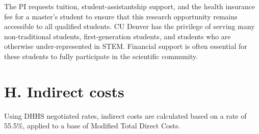 \documentclass[11pt,oneside]{memoir}
\begin{document}
The PI requests tuition, student-assistantship support, and the health insurance fee for a master's student to ensure that this research opportunity remains accessible to all qualified students.  CU Denver has the privilege of serving many non-traditional students, first-generation students, and students who are otherwise under-represented in STEM.  Financial support is often essential for these students to fully participate in the scientific community.

\section*{H. Indirect costs} 

Using DHHS negotiated rates, indirect costs are calculated based on a rate of 55.5\%, applied to a base of Modified Total Direct Costs. 
\end{document}
